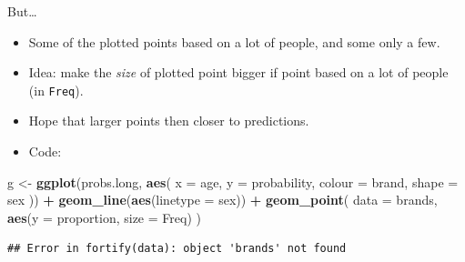 \documentclass[ignorenonframetext,]{beamer}
\newenvironment{Shaded}{\begin{snugshade}}{\end{snugshade}}
\newcommand{\DataTypeTok}[1]{\textcolor[rgb]{0.13,0.29,0.53}{#1}}
\newcommand{\KeywordTok}[1]{\textcolor[rgb]{0.13,0.29,0.53}{\textbf{#1}}}
\newcommand{\NormalTok}[1]{#1}
\newcommand{\OperatorTok}[1]{\textcolor[rgb]{0.81,0.36,0.00}{\textbf{#1}}}
\newcommand{\StringTok}[1]{\textcolor[rgb]{0.31,0.60,0.02}{#1}}
\begin{document}
\begin{frame}[fragile]{But\ldots}
\protect\hypertarget{but-1}{}

\begin{itemize}
\item
  Some of the plotted points based on a lot of people, and some only a
  few.
\item
  Idea: make the \emph{size} of plotted point bigger if point based on a
  lot of people (in \texttt{Freq}).
\item
  Hope that larger points then closer to predictions.
\item
  Code:
\end{itemize}

\footnotesize

\begin{Shaded}
\begin{Highlighting}[]
\NormalTok{g <-}\StringTok{ }\KeywordTok{ggplot}\NormalTok{(probs.long, }\KeywordTok{aes}\NormalTok{(}
  \DataTypeTok{x =}\NormalTok{ age, }\DataTypeTok{y =}\NormalTok{ probability,}
  \DataTypeTok{colour =}\NormalTok{ brand, }\DataTypeTok{shape =}\NormalTok{ sex}
\NormalTok{)) }\OperatorTok{+}
\StringTok{  }\KeywordTok{geom_line}\NormalTok{(}\KeywordTok{aes}\NormalTok{(}\DataTypeTok{linetype =}\NormalTok{ sex)) }\OperatorTok{+}
\StringTok{  }\KeywordTok{geom_point}\NormalTok{(}
    \DataTypeTok{data =}\NormalTok{ brands,}
    \KeywordTok{aes}\NormalTok{(}\DataTypeTok{y =}\NormalTok{ proportion, }\DataTypeTok{size =}\NormalTok{ Freq)}
\NormalTok{  )}
\end{Highlighting}
\end{Shaded}

\begin{verbatim}
## Error in fortify(data): object 'brands' not found
\end{verbatim}

\normalsize

\end{frame}
\end{document}
